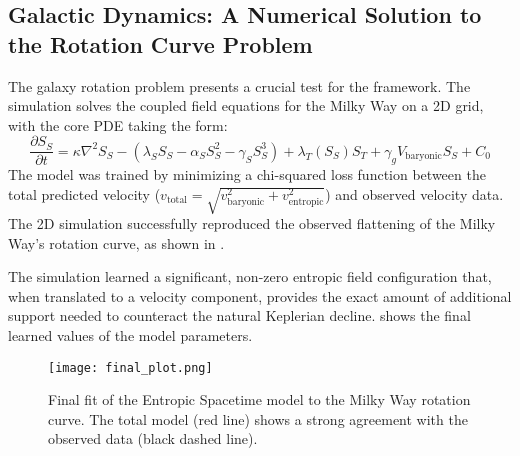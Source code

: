 \documentclass[11pt,a4paper]{article}
\newcommand{\ST}{S_T}
\newcommand{\SSp}{S_S}
\begin{document}
\subsection{Galactic Dynamics: A Numerical Solution to the Rotation Curve Problem}
The galaxy rotation problem presents a crucial test for the framework. The simulation solves the coupled field equations for the Milky Way on a 2D grid, with the core PDE taking the form:
\begin{equation}
    \frac{\partial \SSp}{\partial t} = \kappa \nabla^2 \SSp - (\lambda_S \SSp - \alpha_S \SSp^2 - \gamma_S \SSp^3) + \lambda_T(\SSp) \ST + \gamma_g V_{\text{baryonic}} \SSp + C_0
    \label{eq:pde_implemented}
\end{equation}
The model was trained by minimizing a chi-squared loss function between the total predicted velocity ($v_{\text{total}} = \sqrt{v_{\text{baryonic}}^2 + v_{\text{entropic}}^2}$) and observed velocity data. The 2D simulation successfully reproduced the observed flattening of the Milky Way's rotation curve, as shown in .

The simulation learned a significant, non-zero entropic field configuration that, when translated to a velocity component, provides the exact amount of additional support needed to counteract the natural Keplerian decline.  shows the final learned values of the model parameters.

\begin{figure}[h!]
    \centering
    \texttt{[image: final\_plot.png]} %
    \caption{Final fit of the Entropic Spacetime model to the Milky Way rotation curve. The total model (red line) shows a strong agreement with the observed data (black dashed line).}
    \label{fig:rotation_curve_fit}
\end{figure}
\end{document}
